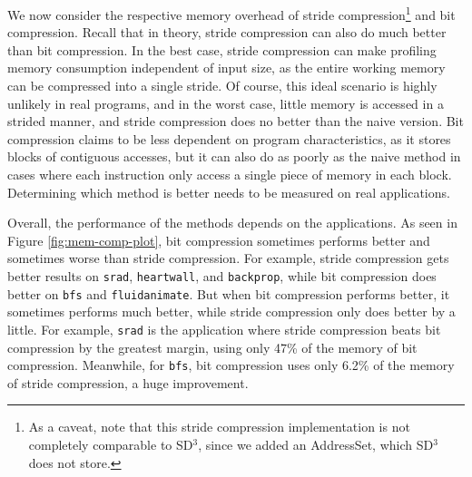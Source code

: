 \documentclass[12pt,twoside]{reedthesis}
\begin{document}
		We now consider the respective memory overhead of stride compression\footnote{As a caveat, note that this stride compression implementation is not completely comparable to SD$^3$, since we added an AddressSet, which SD$^3$ does not store.} and bit compression. 
		Recall that in theory, stride compression can also do much better than bit compression. In the best case, stride compression can make profiling memory consumption independent of input size, as the entire working memory can be compressed into a single stride. Of course, this ideal scenario is highly unlikely in real programs, and in the worst case, little memory is accessed in a strided manner, and stride compression does no better than the naive version. Bit compression claims to be less dependent on program characteristics, as it stores blocks of contiguous accesses, but it can also do as poorly as the naive method in cases where each instruction only access a single piece of memory in each block. Determining which method is better needs to be measured on real applications. 
		
		Overall, the performance of the methods depends on the applications. As seen in Figure \ref{fig:mem-comp-plot}, bit compression sometimes performs better and sometimes worse than stride compression. For example, stride compression gets better results on \texttt{srad}, \texttt{heartwall}, and \texttt{backprop}, while bit compression does better on \texttt{bfs} and \texttt{fluidanimate}. But when bit compression performs better, it sometimes performs much better, while stride compression only does better by a little. For example, \texttt{srad} is the application where stride compression beats bit compression by the greatest margin, using only 47\% of the memory of bit compression. Meanwhile, for \texttt{bfs}, bit compression uses only 6.2\% of the memory of stride compression, a huge improvement.


%		
%		
\end{document}
